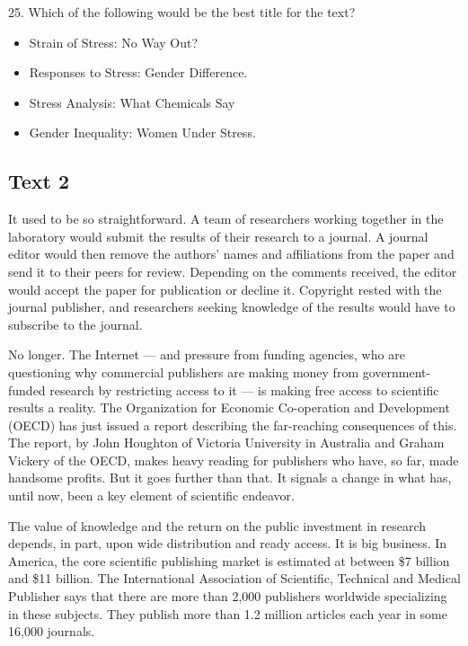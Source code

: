 \documentclass[UTF8,11pt]{ctexart}
\begin{document}
25. Which of the following would be the best title for the text?


\begin{itemize}[leftmargin=2em,itemsep=.2em,topsep=.4em]\item[A.] Strain of Stress: No Way Out?
\item[B.] Responses to Stress: Gender Difference.
\item[C.] Stress Analysis: What Chemicals Say
\item[D.] Gender Inequality: Women Under Stress.
\end{itemize}

\subsection*{\textbf{Text 2}}


It used to be so straightforward. A team of researchers working together in the laboratory would submit the results of their research to a journal. A journal editor would then remove the authors’ names and affiliations from the paper and send it to their peers for review. Depending on the comments received, the editor would accept the paper for publication or decline it. Copyright rested with the journal publisher, and researchers seeking knowledge of the results would have to subscribe to the journal.


No longer. The Internet — and pressure from funding agencies, who are questioning why commercial publishers are making money from government-funded research by restricting access to it — is making free access to scientific results a reality. The Organization for Economic Co-operation and Development (OECD) has just issued a report describing the far-reaching consequences of this. The report, by John Houghton of Victoria University in Australia and Graham Vickery of the OECD, makes heavy reading for publishers who have, so far, made handsome profits. But it goes further than that. It signals a change in what has, until now, been a key element of scientific endeavor.


The value of knowledge and the return on the public investment in research depends, in part, upon wide distribution and ready access. It is big business. In America, the core scientific publishing market is estimated at between \$7 billion and \$11 billion. The International Association of Scientific, Technical and Medical Publisher says that there are more than 2,000 publishers worldwide specializing in these subjects. They publish more than 1.2 million articles each year in some 16,000 journals.
\end{document}
